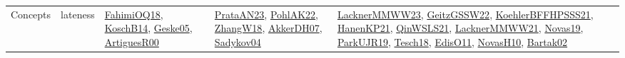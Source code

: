 {\begin{longtable}{lp{3cm}>{\raggedright}p{6cm}>{\raggedright}p{6cm}p{8cm}}
Concepts & lateness & \href{articles/FahimiOQ18.pdf}{FahimiOQ18}\cite{FahimiOQ18}, \href{papers/KoschB14.pdf}{KoschB14}\cite{KoschB14}, \href{papers/Geske05.pdf}{Geske05}\cite{Geske05}, \href{articles/ArtiguesR00.pdf}{ArtiguesR00}\cite{ArtiguesR00} & \href{articles/PrataAN23.pdf}{PrataAN23}\cite{PrataAN23}, \href{articles/PohlAK22.pdf}{PohlAK22}\cite{PohlAK22}, \href{articles/ZhangW18.pdf}{ZhangW18}\cite{ZhangW18}, \href{papers/AkkerDH07.pdf}{AkkerDH07}\cite{AkkerDH07}, \href{papers/Sadykov04.pdf}{Sadykov04}\cite{Sadykov04} & \href{articles/LacknerMMWW23.pdf}{LacknerMMWW23}\cite{LacknerMMWW23}, \href{papers/GeitzGSSW22.pdf}{GeitzGSSW22}\cite{GeitzGSSW22}, \href{articles/KoehlerBFFHPSSS21.pdf}{KoehlerBFFHPSSS21}\cite{KoehlerBFFHPSSS21}, \href{papers/HanenKP21.pdf}{HanenKP21}\cite{HanenKP21}, \href{articles/QinWSLS21.pdf}{QinWSLS21}\cite{QinWSLS21}, \href{papers/LacknerMMWW21.pdf}{LacknerMMWW21}\cite{LacknerMMWW21}, \href{articles/Novas19.pdf}{Novas19}\cite{Novas19}, \href{papers/ParkUJR19.pdf}{ParkUJR19}\cite{ParkUJR19}, \href{papers/Tesch18.pdf}{Tesch18}\cite{Tesch18}, \href{papers/EdisO11.pdf}{EdisO11}\cite{EdisO11}, \href{articles/NovasH10.pdf}{NovasH10}\cite{NovasH10}, \href{papers/Bartak02.pdf}{Bartak02}\cite{Bartak02}\\

\end{longtable}}
